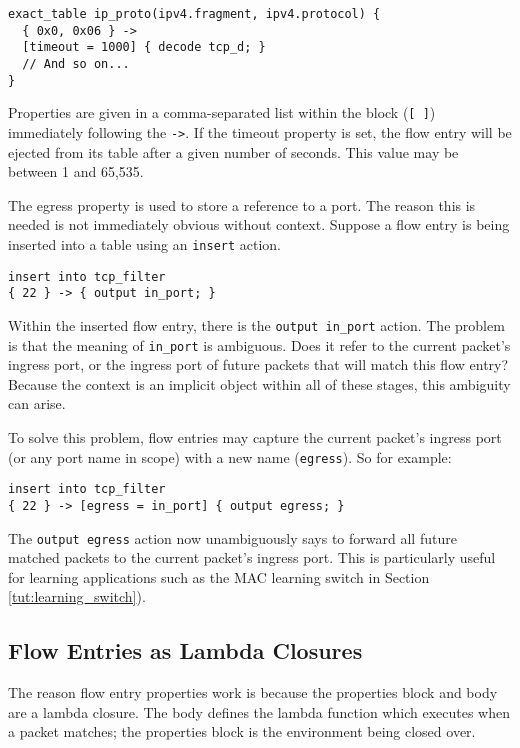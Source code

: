 \begin{lstlisting}
exact_table ip_proto(ipv4.fragment, ipv4.protocol) {
  { 0x0, 0x06 } ->
  [timeout = 1000] { decode tcp_d; }
  // And so on...
}
\end{lstlisting}

Properties are given in a comma-separated list within the block (\texttt{[ ]}) 
immediately following the \texttt{->}. 
If the timeout property is set, the flow entry will be ejected from its table
after a given number of seconds. This value may be between 1 and 65,535.

The egress property is used to store a reference to a port.
The reason this is needed is not immediately obvious without context.
Suppose a flow entry is being inserted into a table using an
\texttt{insert} action.

\begin{lstlisting}
insert into tcp_filter
{ 22 } -> { output in_port; }
\end{lstlisting}

Within the inserted flow entry, there is the \texttt{output in\_port} action.
The problem is that the meaning of \texttt{in\_port} is ambiguous. 
Does it refer to the current packet's ingress port, or the ingress port of
future packets that will match this flow entry? Because the context is
an implicit object within all of these stages, this ambiguity can
arise.

To solve this problem, flow entries may capture the current packet's ingress
port (or any port name in scope) with a new name (\texttt{egress}). So for example:

\begin{lstlisting}
insert into tcp_filter
{ 22 } -> [egress = in_port] { output egress; }
\end{lstlisting}

The \texttt{output egress} action now unambiguously says to forward all future
matched packets to the current packet's ingress port.
This is particularly useful for learning applications such as the MAC learning switch in Section
\ref{tut:learning_switch}).

\subsection{Flow Entries as Lambda Closures}

The reason flow entry properties work is because the properties block and body are a lambda closure. 
The body defines the lambda function which executes when a packet matches; the properties block is the environment being closed over.

